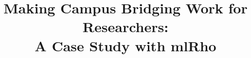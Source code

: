 \documentclass{sig-alternate}
\begin{document}
%

\title{Making Campus Bridging Work for Researchers: \\A Case Study with mlRho}

%
%
%
%
%
\end{document}
